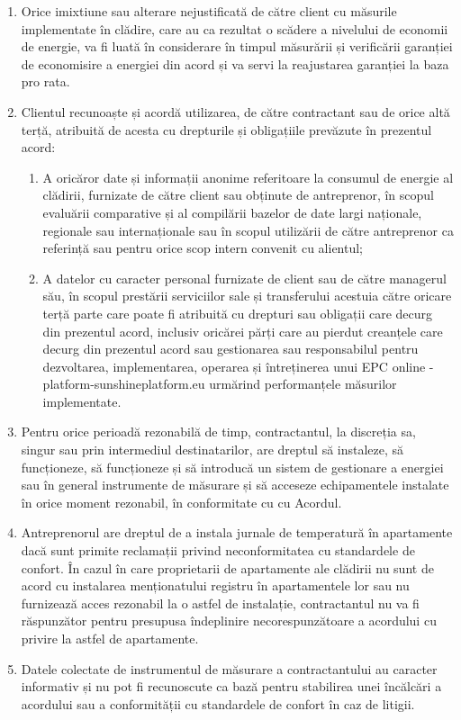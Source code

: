 \begin{multicols}{2}
\begin{enumerate}
\item Orice imixtiune sau alterare nejustificată de către client cu măsurile implementate în clădire, care au ca rezultat o scădere a nivelului de economii de energie, va fi luată în considerare în timpul măsurării și verificării garanției de economisire a energiei din acord și va servi la reajustarea garanției la baza pro rata.
\item Clientul recunoaște și acordă utilizarea, de către contractant sau de orice altă terță, atribuită de acesta cu drepturile și obligațiile prevăzute în prezentul acord:
\begin{enumerate}
\item A oricăror date și informații anonime referitoare la consumul de energie al clădirii, furnizate de către client sau obținute de antreprenor, în scopul evaluării comparative și al compilării bazelor de date largi naționale, regionale sau internaționale sau în scopul utilizării de către antreprenor ca referință sau pentru orice scop intern convenit cu alientul;
\item A datelor cu caracter personal furnizate de client sau de către managerul său, în scopul prestării serviciilor sale și transferului acestuia către oricare terță parte care poate fi atribuită cu drepturi sau obligații care decurg din prezentul acord, inclusiv oricărei părți care au pierdut creanțele care decurg din prezentul acord sau gestionarea sau responsabilul pentru dezvoltarea, implementarea, operarea și întreținerea unui EPC online -platform-sunshineplatform.eu urmărind performanțele măsurilor implementate.
\end{enumerate}
\item Pentru orice perioadă rezonabilă de timp, contractantul, la discreția sa, singur sau prin intermediul destinatarilor, are dreptul să instaleze, să funcționeze, să funcționeze și să introducă un sistem de gestionare a energiei sau în general instrumente de măsurare și să acceseze echipamentele instalate în orice moment rezonabil, în conformitate cu cu Acordul.
\item Antreprenorul are dreptul de a instala jurnale de temperatură în apartamente dacă sunt primite reclamații privind neconformitatea cu standardele de confort. În cazul în care proprietarii de apartamente ale clădirii nu sunt de acord cu instalarea menționatului registru în apartamentele lor sau nu furnizează acces rezonabil la o astfel de instalație, contractantul nu va fi răspunzător pentru presupusa îndeplinire necorespunzătoare a acordului cu privire la astfel de apartamente.
\item Datele colectate de instrumentul de măsurare a contractantului au caracter informativ și nu pot fi recunoscute ca bază pentru stabilirea unei încălcări a acordului sau a conformității cu standardele de confort în caz de litigii.
\end{enumerate}


\end{multicols}
